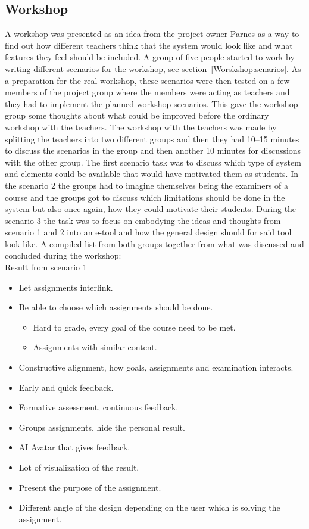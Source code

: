 \documentclass[a4paper,12pt]{article}
\begin{document}
\subsection{Workshop} 
A workshop was presented as an idea from the project owner Parnes as a way to find out how different teachers think that the system would look like and what features they feel should be included. A group of five people started to work by writing different scenarios for the workshop, see section~\ref{Worskshop:senarios}. As a preparation for the real workshop, these scenarios were then tested on a few members of the project group where the members were acting as teachers and they had to implement the planned workshop scenarios. This gave the workshop group some thoughts about what could be improved before the ordinary workshop with the teachers. 
The workshop with the teachers was made by splitting the teachers into two different groups and then they had 10--15 minutes to discuss the scenarios in the group and then another 10 minutes for discussions with the other group. 
The first scenario task was to discuss which type of system and elements could be available that would have motivated them as students. In the scenario 2 the groups had to imagine themselves being the examiners of a course and the groups got to discuss which limitations should be done in the system but also once again, how they could motivate their students. During the scenario 3 the task was to focus on embodying the ideas and thoughts from scenario 1 and 2 into an e-tool and how the general design should for said tool look like. A compiled list from both groups together from what was discussed and concluded during the workshop:
\\
Result from scenario 1
\begin{itemize}
\item Let assignments interlink.
\item Be able to choose which assignments should be done.
    \begin{itemize}
    \item Hard to grade, every goal of the course need to be met.
    \item Assignments with similar content.
    \end{itemize}
\item Constructive alignment, how goals, assignments and examination interacts.
\item Early and quick feedback.
\item Formative assessment, continuous feedback.
\item Groups assignments, hide the personal result.
\item AI Avatar that gives feedback.
\item Lot of visualization of the result.
\item Present the purpose of the assignment.
\item Different angle of the design depending on the user which is solving the assignment.
\end{itemize}
\end{document}
